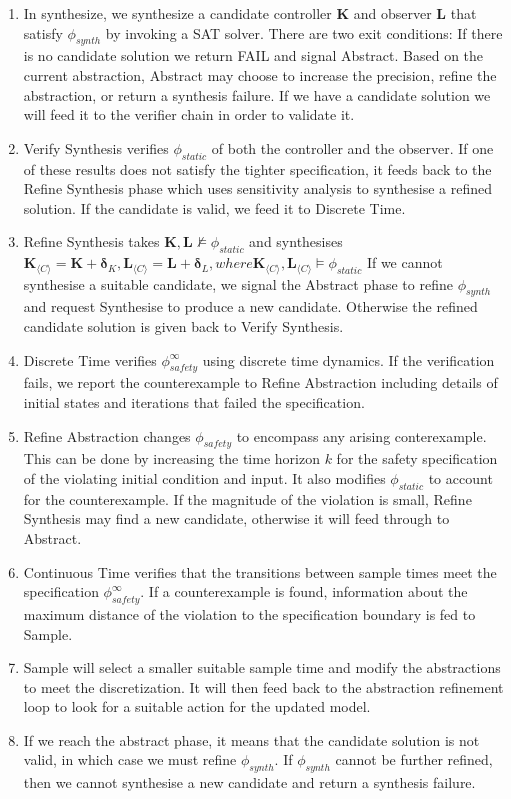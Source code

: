 \documentclass[sigconf]{llncs}
\newcommand{\mat}[1]{\boldsymbol{#1}}
\begin{document}
\begin{enumerate}
\item In {\sc synthesize}, we synthesize a candidate controller $\mat{K}$
and observer $\mat{L}$ that satisfy
$\phi_{synth}$ by invoking a SAT solver.
There are two exit conditions:
If there is no candidate solution we return FAIL and signal {\sc Abstract}. Based on the current abstraction,
{\sc  Abstract} may choose to increase the precision, refine the abstraction, or return a synthesis failure.
If we have a candidate solution we will feed it to the verifier chain in order to validate it.
%
\item {\sc Verify Synthesis} verifies $\phi_{static}$ of  both the
controller and the observer.  If one of these results does not satisfy the tighter
specification, it feeds back to the {\sc Refine Synthesis} phase which uses sensitivity analysis to
synthesise a refined solution. If the candidate is valid, we feed it to {\sc Discrete Time}. 
\item {\sc Refine Synthesis} takes $\mat{K},\mat{L} \not \models \phi_{static}$ and synthesises $\mat{K}_{\langle C \rangle} = \mat{K}+\mat{\delta}_K, \mat{L}_{\langle C \rangle}=\mat{L}+\mat{\delta}_L, where \mat{K}_{\langle C \rangle}, \mat{L}_{\langle C \rangle} \models \phi_{static}$
If we cannot synthesise a suitable candidate, we signal the {\sc Abstract} phase to refine $\phi_{synth}$ and request {\sc Synthesise} to produce a new candidate. Otherwise the refined candidate solution is given back to {\sc Verify Synthesis}.
%
\item {\sc Discrete Time} verifies $\phi_{safety}^{\infty}$ using discrete
time dynamics.  If the verification fails, we report the counterexample to
{\sc Refine Abstraction} including details of initial states and
iterations that failed the specification.  
\item {\sc Refine Abstraction} changes $\phi_{safety}$ to encompass any arising conterexample. 
This can be done by increasing the time horizon $k$ for the safety specification of the violating initial condition and input.
It also modifies $\phi_{static}$ to account for the counterexample.
If the magnitude of the violation is small, {\sc Refine Synthesis} may find a new candidate, otherwise it will feed through to {\sc Abstract}.
%
\item {\sc Continuous Time} verifies that the
transitions between sample times meet the specification $\phi_{safety}^{\infty}$.  If
a counterexample is found, information about the maximum distance of the
violation to the specification boundary is fed to {\sc Sample}. 
\item {\sc Sample} will select a smaller suitable sample time and modify the abstractions to meet the discretization. 
It will then feed back to the abstraction refinement loop to look for a suitable action for the updated model.
%

\item If we reach the {\sc abstract} phase, it means that the candidate
  solution is not valid, in which case we must refine $\phi_{synth}$. If $\phi_{synth}$ cannot be further refined, 
  then we cannot synthesise a new candidate and return a synthesis failure.
\end{enumerate}
\end{document}
